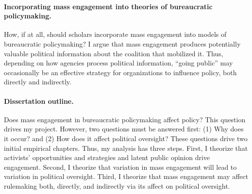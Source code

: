 \documentclass{article}
\begin{document}
\paragraph{Incorporating mass engagement into theories of bureaucratic policymaking.}
How, if at all, should scholars incorporate mass engagement into models of bureaucratic policymaking? 
I argue that mass engagement produces potentially valuable political information about the coalition that mobilized it.
Thus, depending on how agencies process political information, ``going public'' may occasionally be an effective strategy for organizations to influence policy, both directly and indirectly.

\paragraph{Dissertation outline.}
Does mass engagement in bureaucratic policymaking affect policy? This question drives my project. However, two questions must be answered first: (1) Why does it occur? and (2) How does it affect political oversight? These questions drive two initial empirical chapters. Thus, my analysis has three steps.
First, I theorize that activists' opportunities and strategies and latent public opinion drive engagement. Second, I theorize that variation in mass engagement will lead to variation in political oversight. Third, I theorize that mass engagement may affect rulemaking both, directly, and indirectly via its affect on political oversight.


\end{document}
